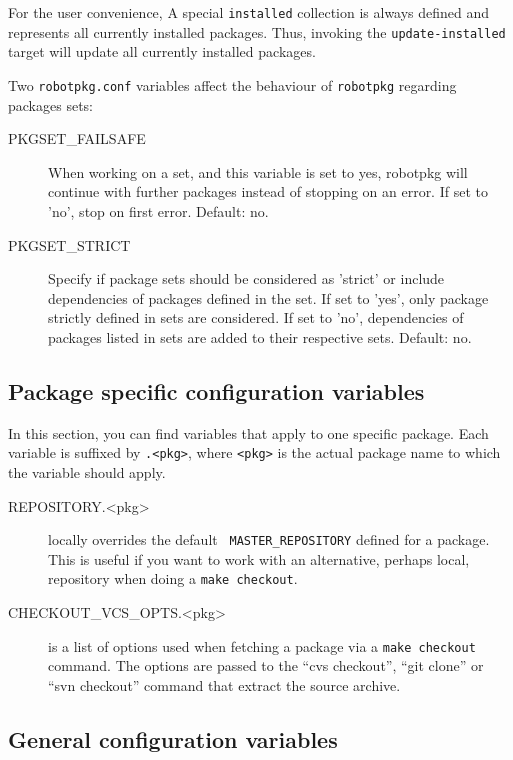 For  the user  convenience,  A  special {\tt  installed}  collection is  always
defined  and represents all  currently installed  packages. Thus,  invoking the
{\tt update-installed} target will update all currently installed packages.

Two {\tt robotpkg.conf} variables affect the behaviour of {\tt robotpkg}
regarding packages sets:

\begin{description}
   \item[PKGSET\_FAILSAFE] When working on a set, and this variable is set to
   yes, robotpkg will continue with further packages instead of stopping on an
   error. If set to 'no', stop on first error. Default: no.

   \item[PKGSET\_STRICT] Specify if package sets should be considered as
   'strict' or include dependencies of packages defined in the set. If set to
   'yes', only package strictly defined in sets are considered. If set to 'no',
   dependencies of packages listed in sets are added to their respective
   sets. Default: no.
\end{description}


\subsection{Package specific configuration variables} %

In this  section, you can  find variables that  apply to one  specific package.
Each  variable is  suffixed by  {\tt.<pkg>}, where  {\tt <pkg>}  is  the actual
package name to which the variable should apply.

\begin{description}
   \item[REPOSITORY.<pkg>] locally overrides the default {\tt
   MASTER\_REPOSITORY} defined for a package. This is useful if you want to
   work with an alternative, perhaps local, repository when doing a {\tt make
   checkout}.

   \item[CHECKOUT\_VCS\_OPTS.<pkg>] is a list of options used when fetching a
   package via a {\tt make checkout} command. The options are passed to the
   ``cvs checkout'', ``git clone'' or ``svn checkout'' command that extract the
   source archive.
\end{description}


\subsection{General configuration variables} %

